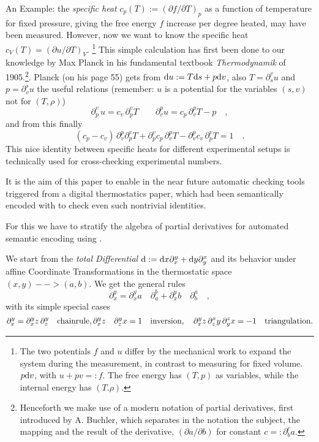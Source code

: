 An Example: the {\emph{specific heat}} $c_p(T) := (\partial f/\partial T)_p$ as a function
of temperature for fixed pressure, giving the free energy $f$ increase per degree heated,
may have been measured. However, now we want to know the specific heat $c_V(T) = (\partial
u / \partial T)_V$.  \footnote{The two potentials $f$ and $u$ differ by the mechanical
  work to expand the system during the measurement, in contrast to measuring for fixed
  volume.  $p {\rm d}v$, with $u + pv =: f$.  The free energy has $(T,p)$ as variables,
  while the internal energy has $(T.\rho)$.}  This simple calculation has first been done
to our knowledge by Max Planck in his fundamental textbook {\sl
  Thermodynamik}\cite{planck-1905} of 1905.\footnote{Henceforth we make use of a modern
  notation of partial derivatives\cite{hilf-suessmann-1972}, first introduced by
  A. Buchler, which separates in the notation the subject, the mapping and the result of
  the derivative, $(\partial a/\partial b)$ for constant $c =: \partial_b^c a$.}.  Planck
(on his page 55) gets from ${\rm d}u := T {\rm d}s + p {\rm d}v$, also $T =
\partial_s^v u $ and $ p = \partial_v^s u$ the useful relations
(remember: $u$ is a potential for the variables $(s,v)$ not for $(T,\rho)$)
\[\partial_p^v \, u = c_v \, \partial_p^v T \qquad \partial_v^p u = c_p \, \partial_v^p T - p
\quad ,\]
and from this  finally
\[(c_p - c_v)\,  \partial_v^p\partial_p^v T +  \partial_p^v c_p \, \partial_v^p T
-  \partial_v^p c_v  \, \partial_p^v T  = 1 \quad .\]
This nice identity between specific heats for different experimental setups
is technically used for cross-checking experimental numbers.

It is the aim of this paper to enable in the near future automatic checking tools
triggered from a digital thermostatics paper, which had been semantically encoded
with {\physml} to check even such nontrivial identities.

For this we have to stratify the algebra of partial derivatives for automated
semantic encoding using {\omdoc}.


We start from the {\emph{total Differential}} ${\rm d} := {\rm d}x \partial_x^y + {\rm
  d}y \partial_y^x $ and its behavior under affine Coordinate Transformations in the
thermostatic space $(x,y) --> (a,b)$.  We get the general rules
\[\partial_x^y = \partial_x^y a \quad \partial_a^b + 
\partial_x^y b \quad \partial_b^a \quad , \]
with its simple special cases
\[\partial_x^y = \partial_x^y z \, \partial_z^y \quad {\rm chain rule},
\partial_x^y z \quad \partial_z^y x = 1 \quad {\rm inversion}, \quad
\partial_x^y z  \,  \partial_z^x y  \, \partial_y^z x = - 1 \quad {\rm triangulation}. \]

